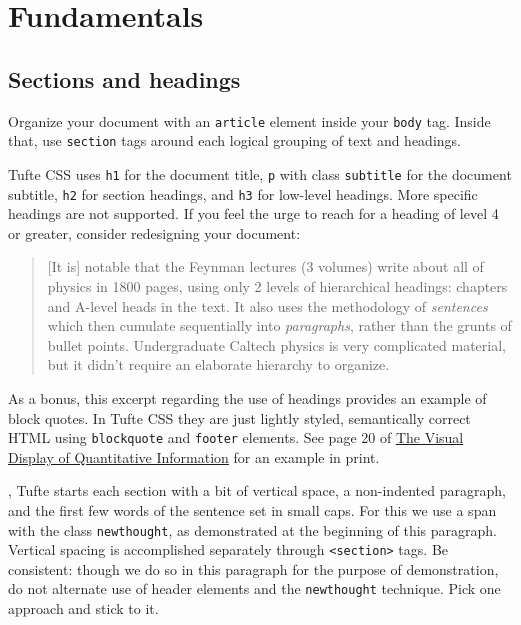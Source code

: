 \documentclass{article}
\begin{document}
\section{Fundamentals}
\subsection{Sections and headings}
Organize your document with an \texttt{article} element inside your \texttt{body} tag. Inside that, use \texttt{section} tags around each logical grouping of text and headings.

Tufte CSS uses \texttt{h1} for the document title, \texttt{p} with class \texttt{subtitle} for the document subtitle, \texttt{h2} for section headings, and \texttt{h3} for low-level headings. More specific headings are not supported. If you feel the urge to reach for a heading of level 4 or greater, consider redesigning your document:

\begin{quote}
{[It is]} notable that the Feynman lectures (3 volumes) write about all of physics in 1800 pages, using only 2 levels of hierarchical headings: chapters and A-level heads in the text. It also uses the methodology of \emph{sentences} which then cumulate sequentially into \emph{paragraphs}, rather than the grunts of bullet points. Undergraduate Caltech physics is very complicated material, but it didn’t require an elaborate hierarchy to organize.

\end{quote}
        
As a bonus, this excerpt regarding the use of headings provides an example of block quotes. In Tufte CSS they are just lightly styled, semantically correct HTML using \texttt{blockquote} and \texttt{footer} elements. See page 20 of \href{https://www.edwardtufte.com/tufte/books\_vdqi}{The Visual Display of Quantitative Information} for an example in print.

, Tufte starts each section with a bit of vertical space, a non-indented paragraph, and the first few words of the sentence set in small caps. For this we use a span with the class \texttt{newthought}, as demonstrated at the beginning of this paragraph. Vertical spacing is accomplished separately through \texttt{<section>} tags. Be consistent: though we do so in this paragraph for the purpose of demonstration, do not alternate use of header elements and the \texttt{newthought} technique. Pick one approach and stick to it.
\end{document}
